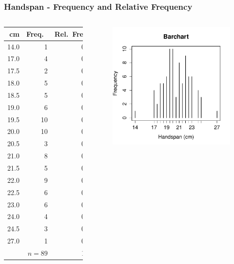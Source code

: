 \documentclass[handout]{beamer}
\begin{document}
\begin{frame}
\frametitle{Handspan - Frequency and Relative Frequency}
\small
\singlespacing


\begin{columns}
\begin{tabular}{rrr}
cm& Freq.\ & Rel.\ Freq.\ \\
\hline
14.0         & 1 &0.01\\
17.0         & 4 &0.05\\
17.5      &  2 &0.02\\
18.0         & 5 &0.06\\
18.5      &  5 &0.06\\
19.0         & 6 &0.07\\
19.5      & 10 &0.11\\
20.0        & 10 &0.11\\
20.5      &  3 &0.03\\
21.0         & 8 &0.09\\
21.5      &  5 &0.06\\
22.0         & 9 &0.10\\
22.5      &  6 &0.07\\
23.0         & 6 &0.07\\
24.0         & 4 &0.05\\
24.5      &  3 &0.03\\
27.0         & 1 &0.01\\
\hline
& $n=89$&1.00
\end{tabular}
\begin{figure}
	\centering
	\includegraphics[scale = 0.55]{./images/handspan_freq}
\end{figure}
\end{columns}
\end{frame}
\end{document}
